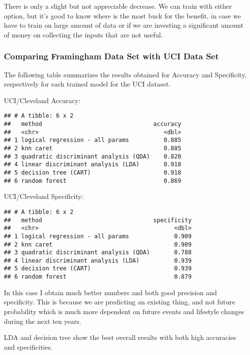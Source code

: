 \documentclass[]{article}
\begin{document}
There is only a slight but not appreciable decrease. We can train with
either option, but it's good to know where is the most buck for the
benefit, in case we have to train on large amount of data or if we are
investing a significant amount of money on collecting the inputs that
are not useful.

\subsubsection{Comparing Framingham Data Set with UCI Data
Set}\label{comparing-framingham-data-set-with-uci-data-set}

The following table summarizes the results obtained for Accuracy and
Specificity, respectively for each trained model for the UCI dataset.

UCI/Cleveland Accuracy:

\begin{verbatim}
## # A tibble: 6 x 2
##   method                                accuracy
##   <chr>                                    <dbl>
## 1 logical regression - all params          0.885
## 2 knn caret                                0.885
## 3 quadratic discriminant analysis (QDA)    0.820
## 4 linear discriminant analysis (LDA)       0.918
## 5 decision tree (CART)                     0.918
## 6 random forest                            0.869
\end{verbatim}

UCI/Cleveland Specificity:

\begin{verbatim}
## # A tibble: 6 x 2
##   method                                specificity
##   <chr>                                       <dbl>
## 1 logical regression - all params             0.909
## 2 knn caret                                   0.909
## 3 quadratic discriminant analysis (QDA)       0.788
## 4 linear discriminant analysis (LDA)          0.939
## 5 decision tree (CART)                        0.939
## 6 random forest                               0.879
\end{verbatim}

In this case I obtain much better numbers and both good precision and
specificity. This is because we are predicting an existing thing, and
not future probability which is much more dependent on future events and
lifestyle changes during the next ten years.

LDA and decision tree show the best overall results with both high
accuracies and specificities.
\end{document}
